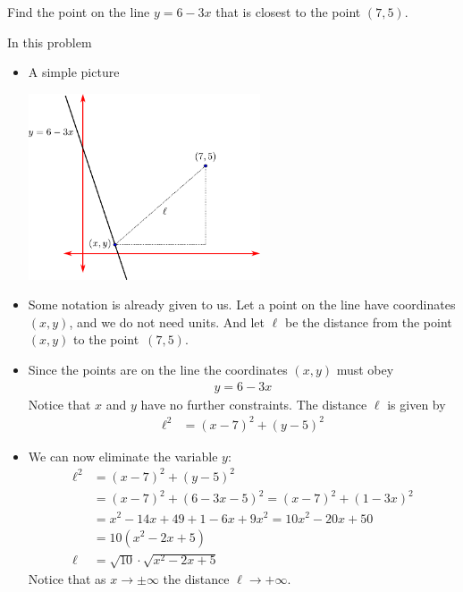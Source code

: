 \begin{eg}\label{APPglobalMaxMinD}
Find the point on the line $y=6-3x$ that is closest to the point $(7,5)$.

\soln In this problem

\begin{itemize}
 \item A simple picture
\begin{efig}
 \begin{center}
  \includegraphics[height=55mm]{extra/line_dist}
 \end{center}
\end{efig}
  \item Some notation is already given to us. Let a point on the line have coordinates
$(x,y)$, and we do not need units. And let $\ell$ be the distance from the point $(x,y)$
to the point~$(7,5)$.
\item Since the points are on the line the coordinates $(x,y)$ must obey
\begin{align*}
  y=6-3x
\end{align*}
Notice that $x$ and $y$ have no further constraints. The distance $\ell$ is given by
\begin{align*}
  \ell^2 &= (x-7)^2 + (y-5)^2
\end{align*}
\item We can now eliminate the variable $y$:
\begin{align*}
  \ell^2 &= (x-7)^2 + (y-5)^2 \\
  &= (x-7)^2 + (6-3x-5)^2 = (x-7)^2 + (1-3x)^2 \\
  &= x^2-14x+49 + 1-6x+9x^2 = 10x^2-20x+50 \\
  &= 10(x^2-2x+5) \\
  \ell &= \sqrt{10} \cdot \sqrt{x^2-2x+5}
\end{align*}
Notice that as $x \to \pm \infty$ the distance $\ell \to +\infty$.


\end{itemize}
\end{eg}
